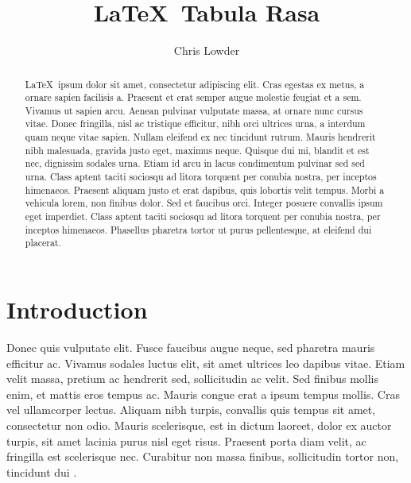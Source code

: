\documentclass[]{aastex62}
\begin{document}
\title{\LaTeX\ Tabula Rasa}


\author[0000-0001-8318-8229]{Chris Lowder}

\begin{abstract}

\LaTeX\ ipsum dolor sit amet, consectetur adipiscing elit. Cras egestas ex metus, a ornare sapien facilisis a. Praesent et erat semper augue molestie feugiat et a sem. Vivamus ut sapien arcu. Aenean pulvinar vulputate massa, at ornare nunc cursus vitae. Donec fringilla, nisl ac tristique efficitur, nibh orci ultrices urna, a interdum quam neque vitae sapien. Nullam eleifend ex nec tincidunt rutrum. Mauris hendrerit nibh malesuada, gravida justo eget, maximus neque. Quisque dui mi, blandit et est nec, dignissim sodales urna. Etiam id arcu in lacus condimentum pulvinar sed sed urna. Class aptent taciti sociosqu ad litora torquent per conubia nostra, per inceptos himenaeos. Praesent aliquam justo et erat dapibus, quis lobortis velit tempus. Morbi a vehicula lorem, non finibus dolor. Sed et faucibus orci. Integer posuere convallis ipsum eget imperdiet. Class aptent taciti sociosqu ad litora torquent per conubia nostra, per inceptos himenaeos. Phasellus pharetra tortor ut purus pellentesque, at eleifend dui placerat.

\end{abstract}

\section{Introduction} \label{sec:introduction}

Donec quis vulputate elit. Fusce faucibus augue neque, sed pharetra mauris efficitur ac. Vivamus sodales luctus elit, sit amet ultrices leo dapibus vitae. Etiam velit massa, pretium ac hendrerit sed, sollicitudin ac velit. Sed finibus mollis enim, et mattis eros tempus ac. Mauris congue erat a ipsum tempus mollis. Cras vel ullamcorper lectus. Aliquam nibh turpis, convallis quis tempus sit amet, consectetur non odio. Mauris scelerisque, est in dictum laoreet, dolor ex auctor turpis, sit amet lacinia purus nisl eget risus. Praesent porta diam velit, ac fringilla est scelerisque nec. Curabitur non massa finibus, sollicitudin tortor non, tincidunt dui \citep{1859MNRAS..20...13C}.
\end{document}
